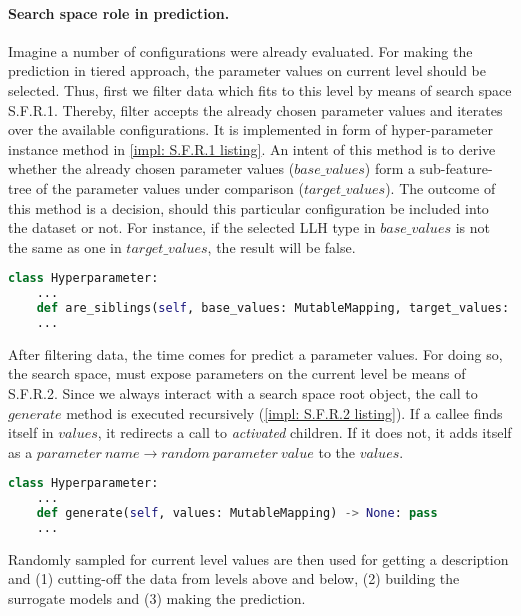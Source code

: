 \paragraph{Search space role in prediction.}
Imagine a number of configurations were already evaluated. For making the prediction in tiered approach, the parameter values on current level should be selected. Thus, first we filter data which fits to this level by means of search space S.F.R.1. Thereby, filter accepts the already chosen parameter values and iterates over the available configurations. It is implemented in form of hyper-parameter instance method in \cref{impl: S.F.R.1 listing}.
An intent of this method is to derive whether the already chosen parameter values ($base\_values$) form a sub-feature-tree of the parameter values under comparison ($target\_values$). The outcome of this method is a decision, should this particular configuration be included into the dataset or not. For instance, if the selected LLH type in $base\_values$ is not the same as one in $target\_values$, the result will be false.

\begin{lstlisting}[language=Python, caption=S.F.R.1 implementation., label=impl: S.F.R.1 listing]
class Hyperparameter:
	...
    def are_siblings(self, base_values: MutableMapping, target_values: MutableMapping) -> bool: pass
	...
\end{lstlisting}

After filtering data, the time comes for predict a parameter values. For doing so, the search space, must expose parameters on the current level be means of S.F.R.2. Since we always interact with a search space root object, the call to $generate$ method is executed recursively (\cref{impl: S.F.R.2 listing}). If a callee finds itself in $values$, it redirects a call to \textit{activated} children. If it does not, it adds itself as a $parameter\ name \rightarrow random\ parameter\ value$ to the $values$.

\begin{lstlisting}[language=Python, caption=S.F.R.2 implementation., label=impl: S.F.R.2 listing]
class Hyperparameter:
	...
    def generate(self, values: MutableMapping) -> None: pass
	...
\end{lstlisting}

Randomly sampled for current level values are then used for getting a description and (1) cutting-off the data from levels above and below, (2) building the surrogate models and (3) making the prediction.

